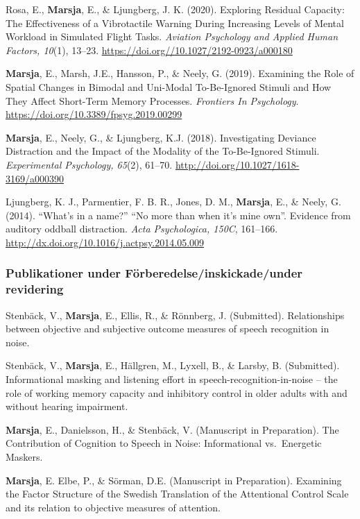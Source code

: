 \documentclass[]{article}
\begin{document}
Rosa, E., \textbf{Marsja}, E., \& Ljungberg, J. K. (2020). Exploring
Residual Capacity: The Effectiveness of a Vibrotactile Warning During
Increasing Levels of Mental Workload in Simulated Flight Tasks.
\emph{Aviation Psychology and Applied Human Factors, 10}(1), 13--23.
\url{https://doi.org//10.1027/2192-0923/a000180}

\textbf{Marsja}, E., Marsh, J.E., Hansson, P., \& Neely, G. (2019).
Examining the Role of Spatial Changes in Bimodal and Uni-Modal
To-Be-Ignored Stimuli and How They Affect Short-Term Memory Processes.
\emph{Frontiers In Psychology}.
\url{https://doi.org/10.3389/fpsyg.2019.00299}

\textbf{Marsja}, E., Neely, G., \& Ljungberg, K.J. (2018). Investigating
Deviance Distraction and the Impact of the Modality of the To-Be-Ignored
Stimuli. \emph{Experimental Psychology, 65}(2), 61--70.
\url{http://doi.org/10.1027/1618-3169/a000390}

Ljungberg, K. J., Parmentier, F. B. R., Jones, D. M., \textbf{Marsja},
E., \& Neely, G. (2014). ``What's in a name?'' ``No more than when it's
mine own''. Evidence from auditory oddball distraction. \emph{Acta
Psychologica, 150C}, 161--166.
\url{http://dx.doi.org/10.1016/j.actpsy.2014.05.009}

\hypertarget{publikationer-under-fuxf6rberedelseinskickadeunder-revidering}{%
\subsubsection{Publikationer under Förberedelse/inskickade/under
revidering}\label{publikationer-under-fuxf6rberedelseinskickadeunder-revidering}}

Stenbäck, V., \textbf{Marsja}, E., Ellis, R., \& Rönnberg, J.
(Submitted). Relationships between objective and subjective outcome
measures of speech recognition in noise.

Stenbäck, V., \textbf{Marsja}, E., Hällgren, M., Lyxell, B., \& Larsby,
B. (Submitted). Informational masking and listening effort in
speech-recognition-in-noise -- the role of working memory capacity and
inhibitory control in older adults with and without hearing impairment.

\textbf{Marsja}, E., Danielsson, H., \& Stenbäck, V. (Manuscript in
Preparation). The Contribution of Cognition to Speech in Noise:
Informational vs.~Energetic Maskers.

\textbf{Marsja}, E. Elbe, P., \& Sörman, D.E. (Manuscript in
Preparation). Examining the Factor Structure of the Swedish Translation
of the Attentional Control Scale and its relation to objective measures
of attention.
\end{document}

